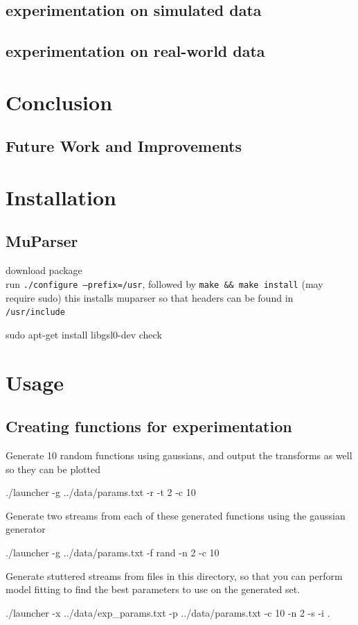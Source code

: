 \documentclass[a4paper,11pt]{article}
\begin{document}
\subsection{experimentation on simulated data}
\label{sec-7-1}
\subsection{experimentation on real-world data}
\label{sec-7-2}
\section{Conclusion}
\label{sec-8}
\subsection{Future Work and Improvements}
\label{sec-8-1}

\newpage
\printbibliography
\newpage
\begin{appendices}
\section{Installation}
\label{sec-9}
\subsection{MuParser}
\label{sec-9-1}

 download package\\
 run \texttt{./configure --prefix=/usr}, followed by \texttt{make \&\& make install} (may require sudo)
 this installs muparser so that headers can be found in \texttt{/usr/include}
 \begin{verbatimtab}   
 sudo apt-get install libgsl0-dev check 
 \end{verbatimtab}
\section{Usage}
\label{sec-10}
\subsection{Creating functions for experimentation}
\label{sec-10-1}

   Generate 10 random functions using gaussians, and output the transforms as
   well so they can be plotted
   \begin{verbatimtab}
   ./launcher -g ../data/params.txt -r -t 2 -c 10
   \end{verbatimtab}
   Generate two streams from each of these generated functions using the
   gaussian generator
   \begin{verbatimtab}
   ./launcher -g ../data/params.txt -f rand -n 2 -c 10
   \end{verbatimtab}
   Generate stuttered streams from files in this directory, so that you can
   perform model fitting to find the best parameters to use on the generated
   set.
   \begin{verbatimtab}
   ./launcher -x ../data/exp_params.txt -p ../data/params.txt -c 10 -n 2 -s -i .
   \end{verbatimtab}
   
\end{appendices}
\end{document}
